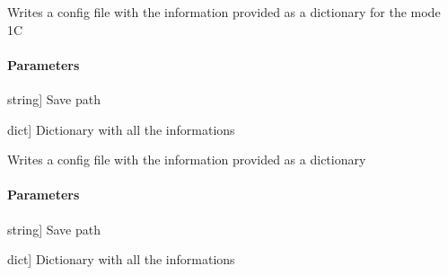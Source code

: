 \documentclass[letterpaper,10pt,english]{sphinxmanual}
\begin{document}
\begin{fulllineitems}
\label{\detokenize{functions:sir.write_config_1c}}
\pysigstartsignatures
{}
\pysigstopsignatures
\sphinxAtStartPar
Writes a config file with the information provided as a dictionary for the mode 1C


\paragraph{Parameters}
\label{\detokenize{functions:id17}}\begin{description}
\sphinxlineitem{File}{[}string{]}
\sphinxAtStartPar
Save path

\sphinxlineitem{conf}{[}dict{]}
\sphinxAtStartPar
Dictionary with all the informations

\end{description}

\end{fulllineitems}


\begin{fulllineitems}
\label{\detokenize{functions:sir.write_config_2c}}
\pysigstartsignatures
{}
\pysigstopsignatures
\sphinxAtStartPar
Writes a config file with the information provided as a dictionary


\paragraph{Parameters}
\label{\detokenize{functions:id18}}\begin{description}
\sphinxlineitem{File}{[}string{]}
\sphinxAtStartPar
Save path

\sphinxlineitem{conf}{[}dict{]}
\sphinxAtStartPar
Dictionary with all the informations

\end{description}

\end{fulllineitems}

\end{document}
